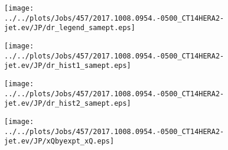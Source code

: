\documentclass[12pt]{article}
\begin{document}
\begin{figure}
\texttt{[image: ../../plots/Jobs/457/2017.1008.0954.-0500\_CT14HERA2-jet.ev/JP/dr\_legend\_samept.eps]}
\caption{}
\end{figure}\newpage\clearpage
\begin{figure}
\texttt{[image: ../../plots/Jobs/457/2017.1008.0954.-0500\_CT14HERA2-jet.ev/JP/dr\_hist1\_samept.eps]}
\caption{}
\end{figure}\newpage\clearpage
\begin{figure}
\texttt{[image: ../../plots/Jobs/457/2017.1008.0954.-0500\_CT14HERA2-jet.ev/JP/dr\_hist2\_samept.eps]}
\caption{}
\end{figure}\newpage\clearpage
\begin{figure}
\texttt{[image: ../../plots/Jobs/457/2017.1008.0954.-0500\_CT14HERA2-jet.ev/JP/xQbyexpt\_xQ.eps]}
\caption{}
\end{figure}\newpage\clearpage
\end{document}
